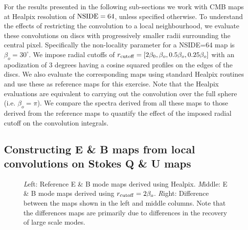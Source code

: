   For the results presented in the following sub-sections we work with CMB maps at Healpix resolution of ${\rm NSIDE}=64$, unless specified otherwise. To understand the effects of restricting the convolution to a local neighbourhood, we evaluate these convolutions on discs with progressively smaller radii surrounding the central pixel.  Specifically the non-locality parameter for a NSIDE=64 map is $\beta_o=30^{\circ}$. We impose radial cutoffs of $r_{\rm cutoff}=[2\beta_0,\beta_o,0.5\beta_o,0.25\beta_o]$ with an apodization of 3 degrees having a cosine squared profiles on the edges of the discs. We also evaluate the corresponding maps using standard Healpix routines and use these as reference maps for this exercise. Note that the Healpix evaluations are equivalent to carrying out the convolution over the full sphere (i.e. $\beta_o=\pi$).  We compare the spectra derived from all these maps to those derived from the reference maps to quantify the effect of the imposed radial cutoff on the convolution integrals.

\subsection{Constructing E \& B maps from local convolutions on Stokes Q \& U maps}

%
\begin{figure}[!h] 
\centering
{}
\caption{{\textit Left:} Reference E \& B mode maps derived using Healpix. {\textit Middle:} E \& B mode maps derived using $r_{\rm cutoff}=2\beta_o$. {\textit Right:} Difference between the maps shown in the left and middle columns. Note that the differences maps are primarily due to differences in the recovery of large scale modes.}
\label{fig:eb-maps-compare}
\end{figure}
%
%
\begin{figure}[!h] 
\centering
{}
\caption{}
\label{fig:eq-spectra_rad_cutoff}
\end{figure}
%
